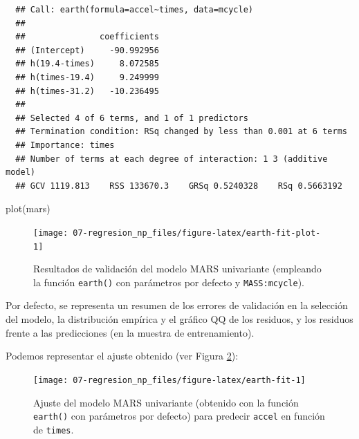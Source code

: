 \documentclass[
]{book}
\newenvironment{Shaded}{\begin{snugshade}}{\end{snugshade}}
\newcommand{\AttributeTok}[1]{\textcolor[rgb]{0.77,0.63,0.00}{#1}}
\newcommand{\FunctionTok}[1]{\textcolor[rgb]{0.00,0.00,0.00}{#1}}
\newcommand{\NormalTok}[1]{#1}
\newcommand{\SpecialCharTok}[1]{\textcolor[rgb]{0.00,0.00,0.00}{#1}}
\newcommand{\StringTok}[1]{\textcolor[rgb]{0.31,0.60,0.02}{#1}}
\theoremstyle{break}
\theoremstyle{nonumberplain}
\begin{document}
\begin{verbatim}
  ## Call: earth(formula=accel~times, data=mcycle)
  ## 
  ##               coefficients
  ## (Intercept)     -90.992956
  ## h(19.4-times)     8.072585
  ## h(times-19.4)     9.249999
  ## h(times-31.2)   -10.236495
  ## 
  ## Selected 4 of 6 terms, and 1 of 1 predictors
  ## Termination condition: RSq changed by less than 0.001 at 6 terms
  ## Importance: times
  ## Number of terms at each degree of interaction: 1 3 (additive model)
  ## GCV 1119.813    RSS 133670.3    GRSq 0.5240328    RSq 0.5663192
\end{verbatim}

\begin{Shaded}
\begin{Highlighting}[]
\FunctionTok{plot}\NormalTok{(mars)}
\end{Highlighting}
\end{Shaded}

\begin{figure}[!htb]

{\centering \texttt{[image: 07-regresion\_np\_files/figure-latex/earth-fit-plot-1]} 

}

\caption{Resultados de validación del modelo MARS univariante (empleando la función \texttt{earth()} con parámetros por defecto y \texttt{MASS:mcycle}).}\label{fig:earth-fit-plot}
\end{figure}

Por defecto, se representa un resumen de los errores de validación en la selección del modelo, la distribución empírica y el gráfico QQ de los residuos, y los residuos frente a las predicciones (en la muestra de entrenamiento).

Podemos representar el ajuste obtenido (ver Figura \ref{fig:earth-fit}):



\begin{Shaded}
\end{Shaded}

\begin{figure}[!htb]

{\centering \texttt{[image: 07-regresion\_np\_files/figure-latex/earth-fit-1]} 

}

\caption{Ajuste del modelo MARS univariante (obtenido con la función \texttt{earth()} con parámetros por defecto) para predecir \texttt{accel} en función de \texttt{times}.}\label{fig:earth-fit}
\end{figure}
\end{document}
